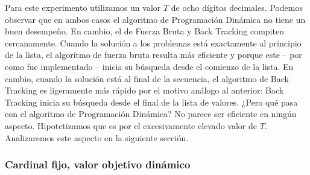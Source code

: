 Para este experimento utilizamos un valor $T$ de ocho dígitos decimales. Podemos observar que en ambos casos el algoritmo de Programación Dinámica no tiene un buen desempeño. En cambio, el de Fuerza Bruta y Back Tracking compiten cercanamente. Cuando la solución a los problemas está exactamente al principio de la lista, el algoritmo de fuerza bruta resulta más eficiente y porque este – por como fue implementado – inicia su búsqueda desde el comienzo de la lista. En cambio, cuando la solución está al final de la secuencia, el algoritmo de Back Tracking es ligeramente más rápido por el motivo análogo al anterior: Back Tracking inicia su búsqueda desde el final de la lista de valores. ¿Pero qué pasa con el algoritmo de Programación Dinámica? No parece ser eficiente en ningún aspecto. Hipotetizamos que es por el excesivamente elevado valor de $T$. Analizaremos este aspecto en la siguiente sección.

\subsubsection{Cardinal fijo, valor objetivo dinámico}
